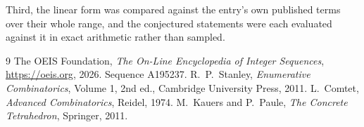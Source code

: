 \documentclass[11pt,a4paper]{article}
\theoremstyle{plain}
\theoremstyle{definition}
\begin{document}
Third, the linear form was compared against the entry's own published terms over their whole
range, and the conjectured statements were each evaluated against it in exact arithmetic
rather than sampled.

\begin{thebibliography}{9}
 The OEIS Foundation, \emph{The On-Line Encyclopedia of Integer
Sequences}, \url{https://oeis.org}, 2026. Sequence A195237.
 R.~P.~Stanley, \emph{Enumerative Combinatorics}, Volume 1, 2nd ed.,
Cambridge University Press, 2011.
 L.~Comtet, \emph{Advanced Combinatorics}, Reidel, 1974.
 M.~Kauers and P.~Paule, \emph{The Concrete Tetrahedron}, Springer, 2011.
\end{thebibliography}
\end{document}
